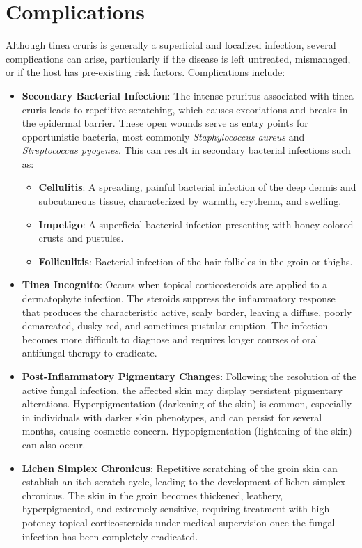\section*{Complications}
Although tinea cruris is generally a superficial and localized infection, several complications can arise, particularly if the disease is left untreated, mismanaged, or if the host has pre-existing risk factors.
Complications include:
\begin{itemize}
    \item \textbf{Secondary Bacterial Infection}: The intense pruritus associated with tinea cruris leads to repetitive scratching, which causes excoriations and breaks in the epidermal barrier. These open wounds serve as entry points for opportunistic bacteria, most commonly \textit{Staphylococcus aureus} and \textit{Streptococcus pyogenes}. This can result in secondary bacterial infections such as:
    \begin{itemize}
        \item \textbf{Cellulitis}: A spreading, painful bacterial infection of the deep dermis and subcutaneous tissue, characterized by warmth, erythema, and swelling.
        \item \textbf{Impetigo}: A superficial bacterial infection presenting with honey-colored crusts and pustules.
        \item \textbf{Folliculitis}: Bacterial infection of the hair follicles in the groin or thighs.
    \end{itemize}
    \item \textbf{Tinea Incognito}: Occurs when topical corticosteroids are applied to a dermatophyte infection. The steroids suppress the inflammatory response that produces the characteristic active, scaly border, leaving a diffuse, poorly demarcated, dusky-red, and sometimes pustular eruption. The infection becomes more difficult to diagnose and requires longer courses of oral antifungal therapy to eradicate.
    \item \textbf{Post-Inflammatory Pigmentary Changes}: Following the resolution of the active fungal infection, the affected skin may display persistent pigmentary alterations. Hyperpigmentation (darkening of the skin) is common, especially in individuals with darker skin phenotypes, and can persist for several months, causing cosmetic concern. Hypopigmentation (lightening of the skin) can also occur.
    \item \textbf{Lichen Simplex Chronicus}: Repetitive scratching of the groin skin can establish an itch-scratch cycle, leading to the development of lichen simplex chronicus. The skin in the groin becomes thickened, leathery, hyperpigmented, and extremely sensitive, requiring treatment with high-potency topical corticosteroids under medical supervision once the fungal infection has been completely eradicated.

\end{itemize}
